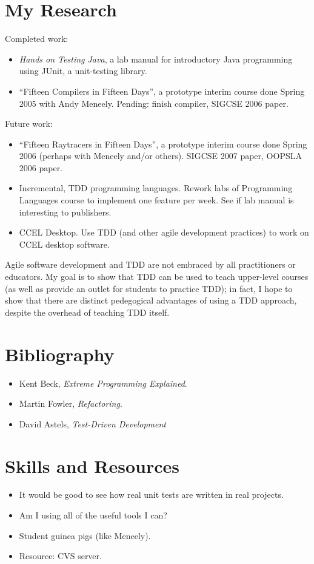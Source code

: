 \documentclass{article}
\begin{document}
\section*{My Research}

Completed work:
\begin{itemize}
\item \textit{Hands on Testing Java}, a lab manual for introductory Java programming using JUnit, a unit-testing library.
\item ``Fifteen Compilers in Fifteen Days'', a prototype interim course done Spring 2005 with Andy Meneely.  Pending: finish compiler, SIGCSE 2006 paper.
\end{itemize}

Future work:
\begin{itemize}
\item ``Fifteen Raytracers in Fifteen Days'', a prototype interim course done Spring 2006 (perhaps with Meneely and/or others).  SIGCSE 2007 paper, OOPSLA 2006 paper.
\item Incremental, TDD programming languages.  Rework labs of Programming Languages course to implement one feature per week.  See if lab manual is interesting to publishers.
\item CCEL Desktop.  Use TDD (and other agile development practices) to work on CCEL desktop software.
\end{itemize}

Agile software development and TDD are not embraced by all practitioners or educators.  My goal is to show that TDD can be used to teach upper-level courses (as well as provide an outlet for students to practice TDD); in fact, I hope to show that there are distinct pedegogical advantages of using a TDD approach, despite the overhead of teaching TDD itself.

\section*{Bibliography}

\begin{itemize}
\item Kent Beck, \textit{Extreme Programming Explained}.
\item Martin Fowler, \textit{Refactoring}.
\item David Astels, \textit{Test-Driven Development}
\end{itemize}

\section*{Skills and Resources}

\begin{itemize}
\item It would be good to see how real unit tests are written in real projects.
\item Am I using all of the useful tools I can?
\item Student guinea pigs (like Meneely).
\item Resource: CVS server.
\end{itemize}
\end{document}
